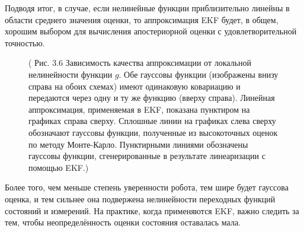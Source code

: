 \documentclass[10pt,a4paper]{article}
\begin{document}
Подводя итог, в случае, если нелинейные функции приблизительно линейны в области среднего значения оценки, то аппроксимация EKF будет, в общем, хорошим выбором для вычисления апостериорной оценки с удовлетворительной точностью. 
\begin{figure}[H]
	\caption{ (  Рис. 3.6 Зависимость качества аппроксимации от локальной нелинейности функции $g$. Обе гауссовы функции (изображены внизу справа на обоих схемах) имеют одинаковую ковариацию и передаются через одну и ту же функцию (вверху справа). Линейная аппроксимация, применяемая в EKF, показана пунктиром на графиках справа сверху. Сплошные линии на графиках слева сверху обозначают гауссовы функции, полученные из высокоточных оценок по методу Монте-Карло. Пунктирными линиями обозначены гауссовы функции, сгенерированные в результате линеаризации с помощью EKF.)}
	\label{fig:36orig}
\end{figure} 
Более того, чем меньше степень уверенности робота, тем шире будет гауссова оценка, и тем сильнее она подвержена нелинейности переходных функций  состояний и измерений. На практике, когда применяются EKF, важно следить за тем, чтобы неопределённость оценки состояния оставалась мала.\\
\end{document}
